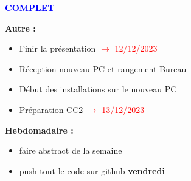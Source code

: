 \textcolor{blue}{\textbf{\large{COMPLET}}}

\textbf{Autre :}
\begin{itemize}[label=$\square$] 
	\item[\done] Finir la présentation \textcolor{red}{$\rightarrow$ 12/12/2023}
	\item[\done] Réception nouveau PC et rangement Bureau
	\item[\done] Début des installations sur le nouveau PC
	\item[\done] Préparation CC2 \textcolor{red}{$\rightarrow$ 13/12/2023}
\end{itemize}
\textbf{Hebdomadaire :}
\begin{itemize}[label=$\square$] 
	\item[\done] faire abstract de la semaine 
	\item[\done] push tout le code sur github \textbf{vendredi}
\end{itemize}